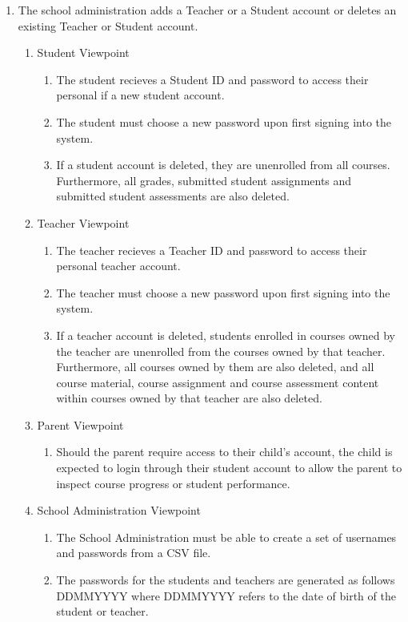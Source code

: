 \documentclass[]{article}
\begin{document}
\begin{enumerate}[{BE}1.]
	\item The school administration adds a Teacher or a Student account or deletes an existing Teacher or Student account.
	\begin{enumerate}[{VP1}.1]
		\item Student Viewpoint
			\begin{enumerate}
				\item The student recieves a Student ID and password to access their personal if a new student account.
				\item The student must choose a new password upon first signing into the system.
				\item If a student account is deleted, they are unenrolled from all courses. Furthermore, all grades, submitted student assignments and submitted student assessments are also deleted.
			\end{enumerate}
		\item Teacher Viewpoint
			\begin{enumerate}
				\item The teacher recieves a Teacher ID and password to access their personal teacher account.
				\item The teacher must choose a new password upon first signing into the system.
				\item If a teacher account is deleted, students enrolled in courses owned by the teacher are unenrolled from the courses owned by that teacher. Furthermore, all courses owned by them are also deleted, and all course material, course assignment and course assessment content within courses owned by that teacher are also deleted.
			\end{enumerate}
		\item Parent Viewpoint
			\begin{enumerate}
				\item Should the parent require access to their child's account, the child is expected to login through their student account to allow the parent to inspect course progress or student performance.
			\end{enumerate}
		\item School Administration Viewpoint
			\begin{enumerate}
				\item The School Administration must be able to create a set of usernames and passwords from a CSV file.
				\item The passwords for the students and teachers are generated as follows DDMMYYYY where DDMMYYYY refers to the date of birth of the student or teacher.

\end{enumerate}
\end{enumerate}
\end{enumerate}
\end{document}
